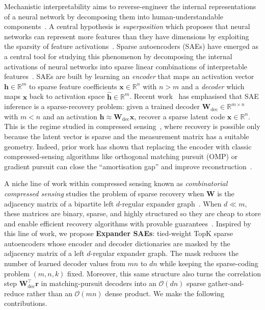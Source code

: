 \documentclass{article}
\theoremstyle{plain}
\theoremstyle{definition}
\theoremstyle{remark}
\begin{document}
Mechanistic interpretability aims to reverse-engineer the internal representations of a neural network by decomposing them into human-understandable components~\citep{olah2020zoom,elhage2022superposition}.
%
A central hypothesis is \emph{superposition} which proposes that neural networks can represent more features than they have dimensions by exploiting the sparsity of feature activations~\citep{elhage2022superposition}.
%
Sparse autoencoders (SAEs) have emerged as a central tool for studying this phenomenon by decomposing the internal activations of neural networks into sparse linear combinations of interpretable features~\citep{cunningham2023sparse, bricken2023monosemanticity, gao2024scaling, templeton2024scaling}.
%
SAEs are built by learning an {\em encoder} that maps an activation vector $\mathbf{h} \in \mathbb{R}^m$ to sparse feature coefficients $\mathbf{x} \in \mathbb{R}^n$ with $n > m$ and a {\em decoder} which maps $\mathbf{x}$ back to activation space $\hat{\mathbf{h}} \in \mathbb{R}^m$.
%
Recent work~\citep{klindt2025superposition, oneill2025amortisation} has emphasised that SAE inference is a sparse-recovery problem: given a trained decoder $\mathbf{W}_{\mathrm{dec}}\in\mathbb{R}^{m\times n}$ with $m<n$ and an activation $\mathbf{h}\approx \mathbf{W}_{\mathrm{dec}} \mathbf{x}$, recover a sparse latent code $\mathbf{x}\in\mathbb{R}^n$. This is the regime studied in compressed sensing~\citep{candes2005decoding, donoho2006compressed}, where recovery is possible only because the latent vector is sparse and the measurement matrix has a suitable geometry.
%
Indeed, prior work has shown that replacing the encoder with classic compressed-sensing algorithms like orthogonal matching pursuit (OMP) \citep{tropp2007omp} or gradient pursuit \citep{blumensath2008gradient} can close the ``amortisation gap'' and improve reconstruction~\citep{gdm2024ito, oneill2025amortisation, costa2025mpsae}.
%

A niche line of work within compressed sensing known as {\em combinatorial compressed sensing} studies the problem of sparse recovery when $\mathbf{W}$ is the adjacency matrix of a bipartite left $d$-regular expander graph~\citep{berinde2008combining, jafarpour2009efficient, indyk2010sparse, mendozasmith2015expander}.
%
%
When $d \ll m$, these matrices are binary, sparse, and highly structured so they are cheap to store and enable efficient recovery algorithms with provable guarantees~\citep{xu2007efficient, berinde2008ssmp, mendozasmith2015expander, mendozasmith2017robust}.
%
Inspired by this line of work, we propose \textbf{Expander SAEs}: tied-weight TopK sparse autoencoders whose encoder and decoder dictionaries are masked by the adjacency matrix of a left $d$-regular expander graph. The mask reduces the number of learned decoder values from $mn$ to $dn$ while keeping the sparse-coding problem $(m, n, k)$ fixed.
%
Moreover, this same structure also turns the correlation step $\mathbf{W}_{\mathrm{dec}}^\top \mathbf{r}$ in matching-pursuit decoders into an $\mathcal{O}(dn)$ sparse gather-and-reduce rather than an $\mathcal{O}(mn)$ dense product. We make the following contributions.
\end{document}
